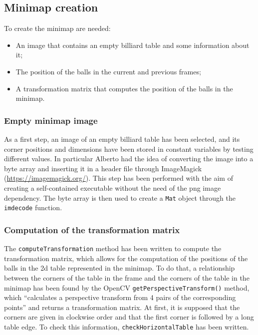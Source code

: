 \subsection{Minimap creation}
To create the minimap are needed:
\begin{itemize}
	\item An image that contains an empty billiard table and some information about it;
	\item The position of the balls in the current and previous frames;
	\item A transformation matrix that computes the position of the balls in the minimap.
\end{itemize}

\subsubsection{Empty minimap image}
As a first step, an image of an empty billiard table has been selected, and its corner positions and dimensions have been stored in constant variables by testing different values. In particular Alberto had the idea of converting the image into a byte array and inserting it in a header file through ImageMagick (\url{https://imagemagick.org/}).
This step has been performed with the aim of creating a self-contained executable without the need of the png image dependency.
The byte array is then used to create a \texttt{Mat} object through the \texttt{imdecode} function.

\subsubsection{Computation of the transformation matrix}
The \texttt{computeTransformation} method has been written to compute the transformation matrix, which allows for the computation of the positions of the balls in the 2d table represented in the minimap. To do that, a relationship between the corners of the table in the frame and the corners of the table in the minimap has been found by the OpenCV \texttt{getPerspectiveTransform()} method, which “calculates a perspective transform from 4 pairs of the corresponding points” and returns a transformation matrix.
At first, it is supposed that the corners are given in clockwise order and that the first corner is followed by a long table edge. To check this information, \texttt{checkHorizontalTable} has been written.

